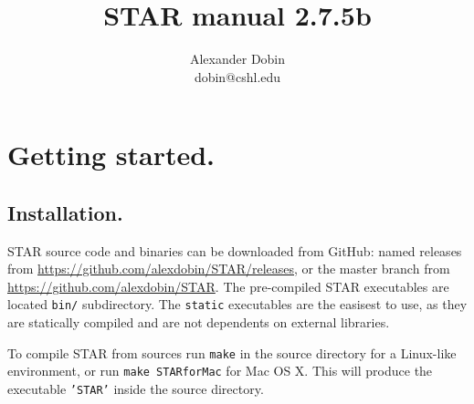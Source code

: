 \documentclass[12pt]{article}
\begin{document}
\hypersetup{
	linkcolor=MidnightBlue
	}


\newcommand{\optn}[1]{\sloppy\textcolor{violet}{\texttt{--#1}}}
\newcommand{\opt}[1]{\sloppy\hyperlink{#1}{\optn{#1}}}
\newcommand{\optv}[1]{\sloppy\texttt{#1}}
\newcommand{\optvr}[1]{\sloppy\textit{\texttt{#1}}}

\newcommand{\code}[1]{\sloppy\texttt{#1}}
	
\newcommand{\codelines}[1]{\begin{adjustwidth}{0.5in}{0in}
	\raggedright\texttt{#1}
	\end{adjustwidth}}

\newcommand{\ofilen}[1]{\sloppy\texttt{#1}}

\newcommand{\sechyperref}[1]{\hyperref[#1]{Section \ref{#1}. \nameref{#1}}}

\title{STAR manual 2.7.5b}
\author{Alexander Dobin\\
dobin@cshl.edu}
\maketitle
\tableofcontents

\newpage

\section{Getting started.}
\subsection{Installation.}

STAR source code and binaries can be downloaded from GitHub: named releases from \url{https://github.com/alexdobin/STAR/releases}, or the master branch from \url{https://github.com/alexdobin/STAR}. The pre-compiled STAR executables are  located \code{bin/} subdirectory. The \code{static} executables are the easisest to use, as they are statically compiled and are not dependents on external libraries. 

To compile STAR from sources run \code{make} in the source directory for a Linux-like environment, or run \code{make STARforMac} for Mac OS X. This will produce the executable \code{'STAR'} inside the source directory.
\end{document}
